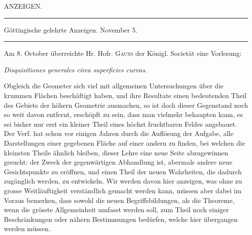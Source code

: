 \begin{center}
\Large ANZEIGEN.\par\medskip
\normalsize\rule{.85\textwidth}{.3pt}\par
Göttingische gelehrte Anzeigen. November 5.\par
\rule{.85\textwidth}{.3pt}
\end{center}
\hspace*{\parindent}Am 8. October überreichte Hr. Hofr. \textsc{Gauss} der Königl. Societät eine Vorlesung:
\begin{center}\textit{Disquisitiones generales circa superficies curvas.}\end{center}
\hspace*{\parindent}Obgleich die Geometer sich viel mit allgemeinen Untersuchungen über die krummen Flächen beschäftigt haben, und ihre Resultate einen bedeutenden Theil des Gebiets der höhern Geometrie ausmachen, so ist doch dieser Gegenstand noch so weit davon entfernt, erschöpft zu sein, dass man vielmehr behaupten kann, es sei bisher nur erst ein kleiner Theil eines höchst fruchtbaren Feldes angebauet. Der Verf. hat schon vor einigen Jahren durch die Auflösung der Aufgabe, alle Darstellungen einer gegebenen Fläche auf einer andern zu finden, bei welchen die kleinsten Theile ähnlich bleiben, dieser Lehre eine neue Seite abzugewinnen gesucht: der Zweck der gegenwärtigen Abhandlung ist, abermals andere neue Gesichtspunkte zu eröffnen, und einen Theil der neuen Wahrheiten, die dadurch zugänglich werden, zu entwickeln. Wir werden davon hier anzeigen, was ohne zu grosse Weitläuftigkeit verständlich gemacht werden kann, müssen aber dabei im Voraus bemerken, dass sowohl die neuen Begriffsbildungen, als die Theoreme, wenn die grösste Allgemeinheit umfasst werden soll, zum Theil noch einiger Beschränkungen oder nähern Bestimmungen bedürfen, welche hier übergangen werden müssen.
